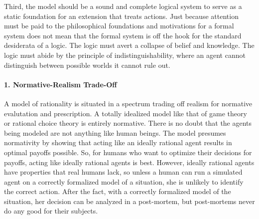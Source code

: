 Third, the model should be a sound and complete logical system to serve as a static foundation for an extension that treats actions. Just because attention must be paid to the philosophical foundations and motivations for a formal system does not mean that the formal system is off the hook for the standard desiderata of a logic. The logic must avert a collapse of belief and knowledge. The logic must abide by the principle of indistinguishability, where an agent cannot distinguish between possible worlds it cannot rule out. 

\paragraph{1. Normative-Realism Trade-Off} 
A model of rationality is situated in a spectrum trading off realism for normative evalutation and prescription. A totally idealized model like that of game theory or rational choice theory is entirely normative. There is no doubt that the agents being modeled are not anything like human beings. The model presumes normativity by showing that acting like an ideally rational agent results in optimal payoffs possible. So, for humans who want to optimize their decisions for payoffs, acting like ideally rational agents is best. However, ideally rational agents have properties that real humans lack, so unless a human can run a simulated agent on a correctly formalized model of a situation, she is unlikely to identify the correct action. After the fact, with a correctly formalized model of the situation, her decision can be analyzed in a post-mortem, but post-mortems never do any good for their subjects.


